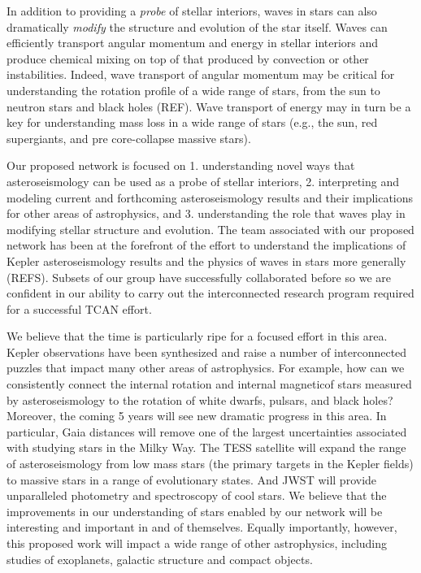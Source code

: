 In addition to providing a {\em probe} of stellar interiors, waves in stars can also dramatically {\em modify} the structure and evolution of the star itself.   Waves can efficiently transport angular momentum and energy in stellar interiors and produce chemical mixing on top of that produced by convection or other instabilities.   Indeed, wave transport of angular momentum may be critical for understanding the rotation profile of a wide range of stars, from the sun to neutron stars and black holes (REF).   Wave transport of energy may in turn be a key for understanding mass loss in a wide range of stars (e.g., the sun, red supergiants, and pre core-collapse massive stars).   

Our proposed network is focused on 1.  understanding novel ways that asteroseismology can be used as a probe of stellar interiors, 2. interpreting and modeling current and forthcoming asteroseismology results and their implications for other areas of astrophysics, and 3.  understanding the role that waves play in modifying stellar structure and evolution.  The team associated with our proposed network has been at the forefront of the effort to understand the implications of Kepler asteroseismology results and the physics of waves in stars more generally (REFS).  Subsets of our group have successfully collaborated before so we are confident in our ability to carry out the interconnected research program required for a successful TCAN effort.   

We believe that the time is particularly ripe for a focused effort in this area.  Kepler observations have been synthesized and raise a number of interconnected puzzles that impact many other areas of astrophysics.  For example, how can we consistently connect the internal rotation and internal magneticof stars measured by asteroseismology to the rotation of white dwarfs, pulsars, and black holes?  Moreover, the coming 5 years will see new dramatic progress in this area. In particular, Gaia distances will remove one of the largest uncertainties associated with studying stars in the Milky Way.  The TESS satellite will expand the range of asteroseismology from low mass stars (the primary targets in the Kepler fields) to massive stars in a range of evolutionary states.   And JWST will provide unparalleled photometry and spectroscopy of cool stars.    We believe that the improvements in our understanding of stars enabled by our network will be interesting and important in and of themselves.  Equally importantly, however, this proposed work will impact a wide range of other astrophysics, including studies of exoplanets, galactic structure and compact objects.   


